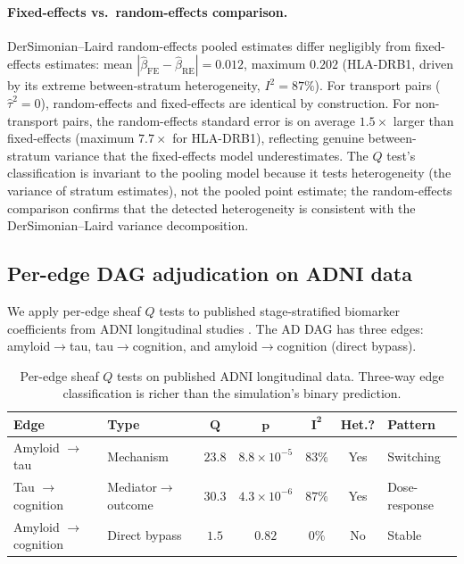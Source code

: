 \documentclass[11pt]{article}
\begin{document}
\paragraph{Fixed-effects vs.\ random-effects comparison.}
DerSimonian--Laird random-effects pooled estimates differ negligibly from fixed-effects estimates: mean $|\hat\beta_{\mathrm{FE}} - \hat\beta_{\mathrm{RE}}| = 0.012$, maximum $0.202$ (HLA-DRB1, driven by its extreme between-stratum heterogeneity, $I^2 = 87\%$).
For transport pairs ($\hat\tau^2 = 0$), random-effects and fixed-effects are identical by construction.
For non-transport pairs, the random-effects standard error is on average $1.5\times$ larger than fixed-effects (maximum $7.7\times$ for HLA-DRB1), reflecting genuine between-stratum variance that the fixed-effects model underestimates.
The $Q$ test's classification is invariant to the pooling model because it tests heterogeneity (the variance of stratum estimates), not the pooled point estimate; the random-effects comparison confirms that the detected heterogeneity is consistent with the DerSimonian--Laird variance decomposition.

\subsection{Per-edge DAG adjudication on ADNI data}
\label{sec:realdata-dag}

We apply per-edge sheaf $Q$ tests to published stage-stratified biomarker coefficients from ADNI longitudinal studies \citep{hanseeuw2019association, jack2019longitudinal, ossenkoppele2022tau}. The AD DAG has three edges: amyloid$\to$tau, tau$\to$cognition, and amyloid$\to$cognition (direct bypass).

\begin{table}[t]
\centering
\caption{Per-edge sheaf $Q$ tests on published ADNI longitudinal data. Three-way edge classification is richer than the simulation's binary prediction.}
\label{tab:realdata-dag}
\small
\begin{tabular}{@{}llccccl@{}}
\toprule
\textbf{Edge} & \textbf{Type} & $\boldsymbol{Q}$ & $\boldsymbol{p}$ & $\boldsymbol{I^2}$ & \textbf{Het.?} & \textbf{Pattern} \\
\midrule
Amyloid $\to$ tau & Mechanism & $23.8$ & $8.8 \times 10^{-5}$ & $83\%$ & Yes & Switching \\
Tau $\to$ cognition & Mediator$\to$outcome & $30.3$ & $4.3 \times 10^{-6}$ & $87\%$ & Yes & Dose-response \\
Amyloid $\to$ cognition & Direct bypass & $1.5$ & $0.82$ & $0\%$ & No & Stable \\
\bottomrule
\end{tabular}
\end{table}
\end{document}
